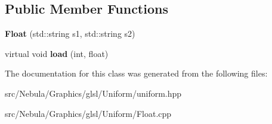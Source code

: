 \subsection*{\-Public \-Member \-Functions}
\begin{DoxyCompactItemize}
\item 
\hypertarget{classNeb_1_1glsl_1_1Uniform_1_1Vector_1_1Float_a79fa9f7bd948d86a054e5ab2bd0f4e40}{{\bfseries \-Float} (std\-::string s1, std\-::string s2)}\label{classNeb_1_1glsl_1_1Uniform_1_1Vector_1_1Float_a79fa9f7bd948d86a054e5ab2bd0f4e40}

\item 
\hypertarget{classNeb_1_1glsl_1_1Uniform_1_1Vector_1_1Float_a76a64c4d0b3237bb2195048f88cb660d}{virtual void {\bfseries load} (int, float)}\label{classNeb_1_1glsl_1_1Uniform_1_1Vector_1_1Float_a76a64c4d0b3237bb2195048f88cb660d}

\end{DoxyCompactItemize}


\-The documentation for this class was generated from the following files\-:\begin{DoxyCompactItemize}
\item 
src/\-Nebula/\-Graphics/glsl/\-Uniform/uniform.\-hpp\item 
src/\-Nebula/\-Graphics/glsl/\-Uniform/\-Float.\-cpp\end{DoxyCompactItemize}
